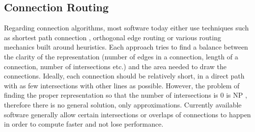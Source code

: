 \subsection{Connection Routing}

Regarding connection algorithms, most software today either use techniques such as shortest path connection \cite{goldberg2005computing}, orthogonal edge routing \cite{eiglsperger2004automatic} or various routing mechanics built around heuristics. Each approach tries to find a 
balance between the clarity of the representation (number of edges in a connection, length of a connection, 
number of intersections etc.) and the area needed to draw the connections. Ideally, each connection should be 
relatively short, in a direct path with as few intersections with other lines as possible. However, the problem
of finding the proper representation so that the number of intersections is 0 is NP \cite{cabello2006planar}, therefore there is no
general solution, only approximations. Currently available software generally allow certain intersections or 
overlaps of connections to happen in order to compute faster and not lose performance.
